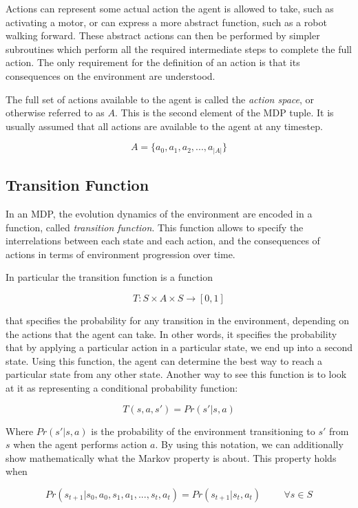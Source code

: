 Actions can represent some actual action the agent is allowed to take, such as activating a motor,
or can express a more abstract function, such as a robot walking forward. These abstract actions can
then be performed by simpler subroutines which perform all the required intermediate steps to
complete the full action. The only requirement for the definition of an action is that its
consequences on the environment are understood.

The full set of actions available to the agent is called the \textit{action space}, or otherwise
referred to as $A$. This is the second element of the MDP tuple. It is usually assumed that all
actions are available to the agent at any timestep.

\[ A = \{ a_0, a_1, a_2, ..., a_{|A|} \} \]

\subsection{Transition Function}

In an MDP, the evolution dynamics of the environment are encoded in a function, called
\textit{transition function}. This function allows to specify the interrelations between each state
and each action, and the consequences of actions in terms of environment progression over time.

In particular the transition function is a function

\[ T: S\times A \times S \rightarrow [0,1] \]

that specifies the probability for any transition in the environment, depending on the actions that
the agent can take. In other words, it specifies the probability that by applying a particular
action in a particular state, we end up into a second state. Using this function, the agent can
determine the best way to reach a particular state from any other state. Another way to see this
function is to look at it as representing a conditional probability function:

\[ T(s, a, s') = Pr(s' | s, a) \]

Where $Pr(s'|s,a)$ is the probability of the environment transitioning to $s'$ from $s$ when the
agent performs action $a$. By using this notation, we can additionally show mathematically what the
Markov property is about. This property holds when

\[ Pr(s_{t+1} | s_{0}, a_{0}, s_{1}, a_{1}, ..., s_{t}, a_{t} ) = Pr(s_{t+1} | s_t, a_t ) \hspace{1cm} \forall s \in S \]

